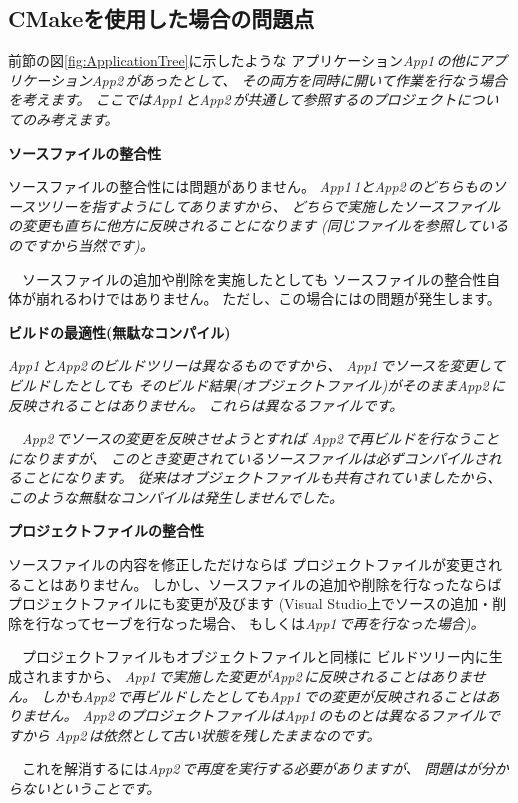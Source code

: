 \subsection{CMakeを使用した場合の問題点}
\label{subsec:Problems}

\def\App#1{\it{App#1\,}}
\def\App#1{\it{App#1\,}}

\noindent
前節の図\ref{fig:ApplicationTree}に示したような
アプリケーション\App{1}の他にアプリケーション\App{2}があったとして、
その両方を同時に開いて作業を行なう場合を考えます。
ここでは\App{1}と\App{2}が共通して参照する\SprLib のプロジェクトについてのみ考えます。

\bigskip
\noindent
\bf{ソースファイルの整合性}
\begin{narrow}[20pt]
	ソースファイルの整合性には問題がありません。
	\App1{1}と\App{2}のどちらも\SprLib のソースツリーを指すようにしてありますから、
	どちらで実施したソースファイルの変更も直ちに他方に反映されることになります
	(同じファイルを参照しているのですから当然です)。

	　ソースファイルの追加や削除を実施したとしても
	ソースファイルの整合性自体が崩れるわけではありません。
	ただし、この場合にはの問題が発生します。
\end{narrow}

\medskip
\noindent
\bf{ビルドの最適性(無駄なコンパイル)}
\begin{narrow}[20pt]
	\App{1}と\App{2}のビルドツリーは異なるものですから、
	\App{1}でソースを変更してビルドしたとしても
	そのビルド結果(オブジェクトファイル)がそのまま\App{2}に反映されることはありません。
	これらは異なるファイルです。

	　\App{2}でソースの変更を反映させようとすれば
	\App{2}で再ビルドを行なうことになりますが、
	このとき変更されているソースファイルは必ずコンパイルされることになります。
	従来はオブジェクトファイルも共有されていましたから、
	このような無駄なコンパイルは発生しませんでした。
\end{narrow}

\medskip
\noindent
\bf{プロジェクトファイルの整合性}
\begin{narrow}[20pt]
	ソースファイルの内容を修正しただけならば
	プロジェクトファイルが変更されることはありません。
	しかし、ソースファイルの追加や削除を行なったならば
	プロジェクトファイルにも変更が及びます
	(Visual Studio上でソースの追加・削除を行なってセーブを行なった場合、
	もしくは\App{1}で再\cmake を行なった場合)。

	　プロジェクトファイルもオブジェクトファイルと同様に
	ビルドツリー内に生成されますから、
	\App{1}で実施した変更が\App{2}に反映されることはありません。
	しかも\App{2}で再ビルドしたとしても\App{1}での変更が反映されることはありません。
	\App{2}のプロジェクトファイルは\App{1}のものとは異なるファイルですから
	\App{2}は依然として古い状態を残したままなのです。

	\indent
	　これを解消するには\App{2}で再度\cmake を実行する必要がありますが、
	問題はが分からないということです。
\end{narrow}

